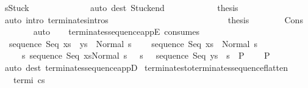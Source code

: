 \begin{isabellebody}
\ {\isachardoublequoteopen}s{\isacharprime}{\isacharequal}Stuck{\isachardoublequoteclose}\isanewline
\ \ \ \ \ \ \ \ \ \ \ \ \isamarkupfalse%
\ {\isacharparenleft}auto\ dest{\isacharcolon}\ Stuck{\isacharunderscore}end{\isacharparenright}\isanewline
\ \ \ \ \ \ \ \ \ \ \isamarkupfalse%
\ {\isacharquery}thesis\ \isamarkupfalse%
\ {\isacharparenleft}auto\ intro{\isacharcolon}\ terminates{\isachardot}intros{\isacharparenright}\isanewline
\ \ \ \ \ \ \ \ \isamarkupfalse%
\isanewline
\ \ \ \ \ \ \isamarkupfalse%
\isanewline
\ \ \ \ \isacommand{{\isacharbraceright}}\isamarkupfalse%
\isanewline
\ \ \ \ \isamarkupfalse%
\ \isamarkupfalse%
\ {\isacharquery}thesis\isanewline
\ \ \ \ \ \ \isamarkupfalse%
\ Cons\isanewline
\ \ \ \ \ \ \isamarkupfalse%
\ auto\isanewline
\ \ \isamarkupfalse%
\isanewline
{}\isamarkupfalse%
%
\endisatagproof
{\isafoldproof}%
%
\isadelimproof
\isanewline
%
\endisadelimproof
\isanewline
{}\isamarkupfalse%
\ terminates{\isacharunderscore}sequence{\isacharunderscore}appE\ {\isacharbrackleft}consumes\ {}{\isacharbrackright}{\isacharcolon}\isanewline
\ \ {\isachardoublequoteopen}{\isasymlbrakk}{\isasymGamma}{\isasymturnstile}sequence\ Seq\ {\isacharparenleft}xs\ {\isacharat}\ ys{\isacharparenright}\ {\isasymdown}\ Normal\ s{\isacharsemicolon}\isanewline
\ \ \ \ {\isasymlbrakk}{\isasymGamma}{\isasymturnstile}sequence\ Seq\ xs\ {\isasymdown}\ Normal\ s{\isacharsemicolon}\isanewline
\ \ \ \ \ {\isasymforall}s{\isacharprime}{\isachardot}\ {\isasymGamma}{\isasymturnstile}{\isasymlangle}sequence\ Seq\ xs{\isacharcomma}Normal\ s\ {\isasymrangle}\ {\isasymRightarrow}\ s{\isacharprime}\ {\isasymlongrightarrow}\ \ {\isasymGamma}{\isasymturnstile}sequence\ Seq\ ys\ {\isasymdown}\ s{\isacharprime}{\isasymrbrakk}\ {\isasymLongrightarrow}\ P{\isasymrbrakk}\isanewline
\ \ \ {\isasymLongrightarrow}\ P{\isachardoublequoteclose}\isanewline
%
\isadelimproof
\ \ %
\endisadelimproof
%
\isatagproof
{}\isamarkupfalse%
\ {\isacharparenleft}auto\ dest{\isacharcolon}\ terminates{\isacharunderscore}sequence{\isacharunderscore}appD{\isacharparenright}%
\endisatagproof
{\isafoldproof}%
%
\isadelimproof
\isanewline
%
\endisadelimproof
\isanewline
{}\isamarkupfalse%
\ terminates{\isacharunderscore}to{\isacharunderscore}terminates{\isacharunderscore}sequence{\isacharunderscore}flatten{\isacharcolon}\ \isanewline
\ \ \ termi{\isacharcolon}\ {\isachardoublequoteopen}{\isasymGamma}{\isasymturnstile}c{\isasymdown}s{\isachardoublequoteclose}\ \isanewline

\end{isabellebody}
